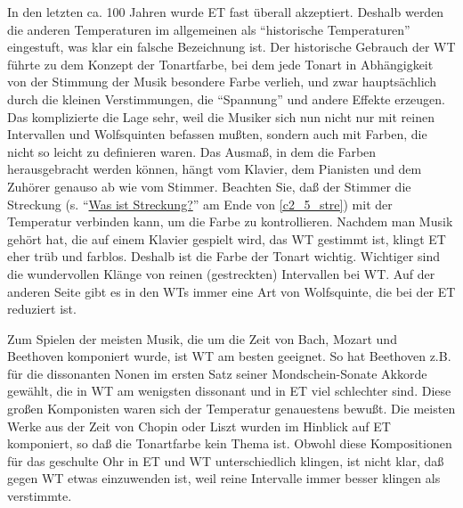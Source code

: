 In den letzten ca. 100 Jahren wurde ET fast überall akzeptiert.
Deshalb werden die anderen Temperaturen im allgemeinen als \enquote{historische Temperaturen} eingestuft, was klar ein falsche Bezeichnung ist.
Der historische Gebrauch der WT führte zu dem Konzept der Tonartfarbe, bei dem jede Tonart in Abhängigkeit von der Stimmung der Musik besondere Farbe verlieh, und zwar hauptsächlich durch die kleinen Verstimmungen, die \enquote{Spannung} und andere Effekte erzeugen.
Das komplizierte die Lage sehr, weil die Musiker sich nun nicht nur mit reinen Intervallen und Wolfsquinten befassen mußten, sondern auch mit Farben, die nicht so leicht zu definieren waren.
Das Ausmaß, in dem die Farben herausgebracht werden können, hängt vom Klavier, dem Pianisten und dem Zuhörer genauso ab wie vom Stimmer.
Beachten Sie, daß der Stimmer die Streckung (s. \enquote{\hyperref[c2_5_stre]{Was ist Streckung?}} am Ende von \autoref{c2_5_stre}) mit der Temperatur verbinden kann, um die Farbe zu kontrollieren.
Nachdem man Musik gehört hat, die auf einem Klavier gespielt wird, das WT gestimmt ist, klingt ET eher trüb und farblos.
Deshalb ist die Farbe der Tonart wichtig.
Wichtiger sind die wundervollen Klänge von reinen (gestreckten) Intervallen bei WT.
Auf der anderen Seite gibt es in den WTs immer eine Art von Wolfsquinte, die bei der ET reduziert ist.

Zum Spielen der meisten Musik, die um die Zeit von Bach, Mozart und Beethoven komponiert wurde, ist WT am besten geeignet.
So hat Beethoven z.B. für die dissonanten Nonen im ersten Satz seiner Mondschein-Sonate Akkorde gewählt, die in WT am wenigsten dissonant und in ET viel schlechter sind.
Diese großen Komponisten waren sich der Temperatur genauestens bewußt.
Die meisten Werke aus der Zeit von Chopin oder Liszt wurden im Hinblick auf ET komponiert, so daß die Tonartfarbe kein Thema ist.
Obwohl diese Kompositionen für das geschulte Ohr in ET und WT unterschiedlich klingen, ist nicht klar, daß gegen WT etwas einzuwenden ist, weil reine Intervalle immer besser klingen als verstimmte.


